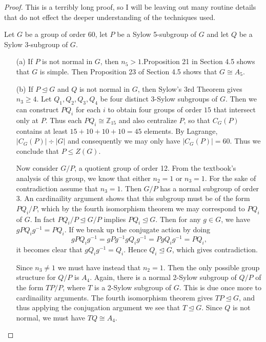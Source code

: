\documentclass[12pt]{article}
\theoremstyle{remark}
\theoremstyle{named}
\newcommand{\normal}{\trianglelefteq}
\begin{document}
\begin{proof}
    This is a terribly long proof, so I will be leaving out many routine details that do not effect the deeper understanding of the techniques used. 

    Let \(G\) be a group of order 60, let \(P\) be a Sylow 5-subgroup of \(G\) and let \(Q\) be a Sylow 3-subgroup of \(G\).
    \begin{enumerate}
        \item[(a)] If \(P\) is not normal in \(G\), then \(n_5 > 1\).Proposition 21 in Section 4.5 shows that \(G\) is simple. Then Proposition 23 of Section 4.5 shows that \(G \cong A_5\). 
         
        \item[(b)] If \(P \normal G\) and \(Q\) is not normal in \(G\), then Sylow's 3rd Theorem gives \(n_3 \ge 4\). Let \(Q_1, Q_2, Q_3, Q_4\) be four distinct 3-Sylow subgroups of \(G\). Then we can construct \(P Q_i\) for each \(i\) to obtain four groups of order \(15\) that intersect only at \(P\). Thus each \(P Q_i \cong \mathbb Z_{15}\) and also centralize \(P\), so that \(C_G(P)\) contains at least \(15 + 10 + 10 + 10 = 45\) elements. 
        By Lagrange, \(|C_G(P)| \div |G|\) and consequently we may only have \(|C_G(P)| = 60\). Thus we conclude that \(P \le Z(G)\). 

        Now consider \(G / P\), a quotient group of order 12. From the textbook's analysis of this group, we know that either \(n_2 = 1\) or \(n_3 = 1\). For the sake of contradiction assume that \(n_3 = 1\). Then \(G / P\) has a normal subgroup of order \(3\). An cardinaility argument shows that this subgroup must be of the form \(P Q_i / P\), which by the fourth isomorphism theorem we may correspond to \(P Q_i\) of \(G\). 
        In fact \(P Q_i / P \normal G / P\) implies \(P Q_i \normal G\). Then for any \(g \in G\), we have \(g P Q_i g^{-1} = P Q_i\). If we break up the conjugate action by doing \[g P Q_i g^{-1} = g P g^{-1} g Q_i g^{-1} = P g Q_i g^{-1} = P Q_i,\]
        it becomes clear that \(g Q_i g^{-1} = Q_i\). Hence \(Q_i \normal G\), which gives contradiction. 

        Since \(n_3 \neq 1\) we must have instead that \(n_2 = 1\). Then the only possible group structure for \(Q / P\) is \(A_4\). Again, there is a normal 2-Sylow subgroup of \(Q / P\) of the form \(T P / P\), where \(T\) is a 2-Sylow subgroup of \(G\). This is due once more to cardinaility arguments. The fourth isomorphism theorem gives \(T P \normal G\), and thus applying the conjugation argument we see that \(T \normal G\). Since \(Q\) is not normal, we must have \(T Q \cong A_4\). 


\end{enumerate}
\end{proof}
\end{document}
